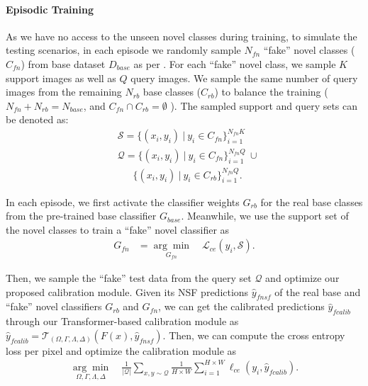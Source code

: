 \documentclass[journal]{IEEEtran}
\begin{document}
\paragraph{Episodic Training} 
\label{ep_t}
As we have no access to the unseen novel classes during training, to simulate the testing scenarios, in each episode we randomly sample $N_{fn}$ ``fake'' novel classes ($C_{fn}$) from base dataset $D_{base}$ as per \cite{gidaris2018dynamic,ye2021learning}. For each ``fake'' novel class, we sample $K$ support images as well as $Q$ query images. We sample the same number of query images from the remaining $N_{rb}$ base classes ($C_{rb}$) to balance the training ($N_{fn} + N_{rb} = N_{base}$, and $C_{fn} \cap C_{rb} = \emptyset$ ). The sampled support and query sets can be denoted as:
\begin{equation}
    \begin{aligned}
        & \mathcal{S} = \{(x_i, y_i)~|~ y_{i} \in C_{fn}\}^{N_{fn}K}_{i=1} \\
        &\mathcal{Q} = \{(x_{i}, y_{i})~|~y_{i}\in C_{fn}\}^{N_{fn}Q}_{i=1} \ \cup \\ 
        &\ \ \ \ \ \ \ \{(x_{i}, y_{i})~|~y_{i} \in C_{rb}\}^{N_{fn}Q}_{i=1}.
    \end{aligned}
\end{equation}

In each episode, we first activate the classifier weights $G_{rb}$ for the real base classes from the pre-trained base classifier $G_{base}$. Meanwhile, we use the support set of the novel classes to train a ``fake'' novel classifier as 
\begin{equation}
\label{eq:fn_loss}
\begin{aligned}
G_{fn} &= \underset{G_{fn}}{\arg\min}\quad \mathcal{L}_{ce}(y_{i}, \mathcal{S}).
\end{aligned}
\end{equation}

Then, we sample the ``fake'' test data from the query set $\mathcal{Q}$ and optimize our proposed calibration module. 
Given its NSF predictions $\hat{y}_{fnsf}$ of the real base and ``fake'' novel classifiers $G_{rb}$ and $G_{fn}$, we can get the calibrated predictions $\hat{y}_{fcalib}$ through our Transformer-based calibration module as $\hat{y}_{fcalib} = \mathcal{T}_{(\Omega, \Gamma, \Lambda, \Delta)}(F(x), \hat{y}_{fnsf})$. Then, we can compute the cross entropy loss per pixel and optimize the calibration module as 
\begin{equation}
\label{eq:pcn_loss}
\begin{aligned}
\underset{\Omega, \Gamma, \Lambda, \Delta}{\arg\min}\quad \frac{1}{|\mathcal{Q}|}\sum_{x, y\sim \mathcal{Q}} \frac{1}{H\times W}\sum_{i=1}^{H\times W} \ell_{ce}(y_{i}, \hat{y}_{fcalib}).
\end{aligned}
\end{equation}
\end{document}
